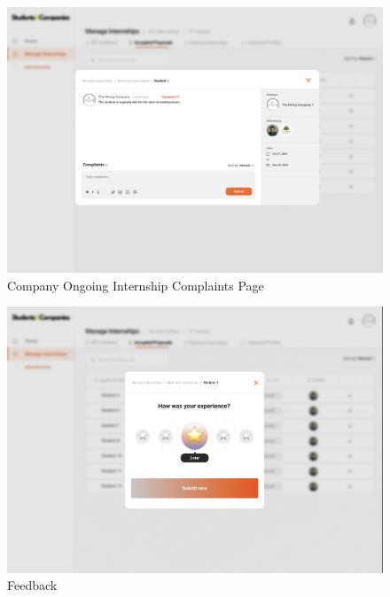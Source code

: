 \documentclass{article}
\begin{document}
\begin{figure}[H]
    \centering
    \includegraphics[scale = 0.42]{figures/UserInterfaces/Company/CompanyComplaints.png}
    \caption{Company Ongoing Internship Complaints Page}
     \centering
\end{figure}
\begin{figure}[H]
    \centering
    \includegraphics[scale = 0.42]{figures/UserInterfaces/Company/FeedbackCompany.png}
    \caption{Feedback}
     \centering
\end{figure}
\end{document}
